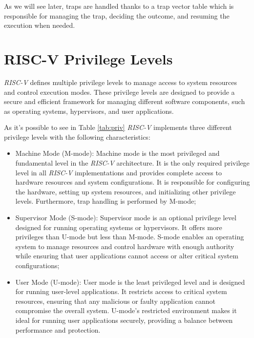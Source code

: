 As we will see later, traps are handled thanks to a trap vector table which is responsible
for managing the trap, deciding the outcome, and resuming the execution when needed.

\section{RISC-V Privilege Levels}
\label{sec:riscv_privileges}

\textit{RISC-V} defines multiple privilege levels to manage access to system resources
and control execution modes. These privilege levels are designed to provide a
secure and efficient framework for managing different software components, such as
operating systems, hypervisors, and user applications.

As it's possible to see in Table \ref{tab:priv} \textit{RISC-V} implements three
different privilege levels with the following characteristics:

\begin{itemize}
  \item Machine Mode (M-mode): Machine mode is the most privileged and
    fundamental level in the \textit{RISC-V} architecture. It is the only
    required privilege level in all \textit{RISC-V} implementations and provides
    complete access to hardware resources and system configurations. It is
    responsible for configuring the hardware, setting up system resources, and
    initializing other privilege levels. Furthermore, trap handling is performed
    by M-mode;

  \item Supervisor Mode (S-mode): Supervisor mode is an optional privilege level
    designed for running operating systems or hypervisors. It offers more privileges
    than U-mode but less than M-mode. S-mode enables an operating system to
    manage resources and control hardware with enough authority while ensuring
    that user applications cannot access or alter critical system configurations;

  \item User Mode (U-mode): User mode is the least privileged level and is
    designed for running user-level applications. It restricts access to critical
    system resources, ensuring that any malicious or faulty application cannot
    compromise the overall system. U-mode's restricted environment makes it ideal
    for running user applications securely, providing a balance between
    performance and protection.
\end{itemize}

